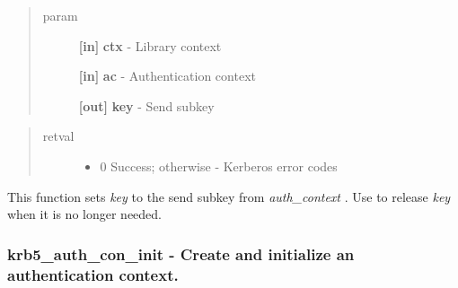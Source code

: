 \documentclass[letterpaper,10pt,english]{sphinxmanual}
\begin{document}
\begin{quote}\begin{description}
\item[{param}] \leavevmode
\textbf{{[}in{]}} \textbf{ctx} - Library context

\textbf{{[}in{]}} \textbf{ac} - Authentication context

\textbf{{[}out{]}} \textbf{key} - Send subkey

\end{description}\end{quote}
\begin{quote}\begin{description}
\item[{retval}] \leavevmode\begin{itemize}
\item {} 
0   Success; otherwise - Kerberos error codes

\end{itemize}

\end{description}\end{quote}

This function sets \emph{key} to the send subkey from \emph{auth\_context} . Use {\hyperref[appdev/refs/api/krb5_k_free_key:krb5_k_free_key]{}} to release \emph{key} when it is no longer needed.


\subsubsection{krb5\_auth\_con\_init -  Create and initialize an authentication context.}
\label{appdev/refs/api/krb5_auth_con_init:krb5-auth-con-init-create-and-initialize-an-authentication-context}\label{appdev/refs/api/krb5_auth_con_init::doc}

\begin{fulllineitems}
\label{appdev/refs/api/krb5_auth_con_init:krb5_auth_con_init}
\end{fulllineitems}
\end{document}
